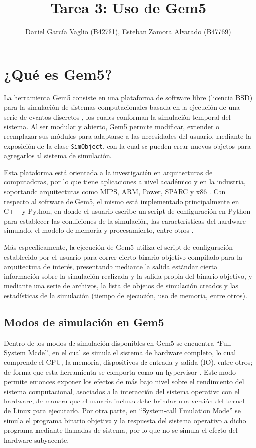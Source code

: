 \documentclass {article}
\begin{document}
\title{Tarea 3: Uso de Gem5}
\author{Daniel García Vaglio (B42781), Esteban Zamora Alvarado (B47769)}

\maketitle

\section{¿Qué es Gem5?}
\cite{opencv} %
La herramienta Gem5 consiste en una plataforma de software libre (licencia BSD) para la simulación
de sistemas computacionales basada en la ejecución de una serie de eventos discretos \cite{***}, los
cuales conforman la simulación temporal del sistema. Al ser modular y abierto, Gem5 permite
modificar, extender o reemplazar sus módulos para adaptarse a las necesidades del usuario, mediante
la exposición de la clase \texttt{SimObject}, con la cual se pueden crear nuevos objetos para
agregarlos al sistema de simulación.

Esta plataforma está orientada a la investigación en arquitecturas de computadoras, por lo que tiene
aplicaciones a nivel académico y en la industria, soportando arquitecturas como MIPS, ARM, Power,
SPARC y x86 \cite{***}. Con respecto al software de Gem5, el mismo está implementado principalmente
en C++ y Python, en donde el usuario escribe un script de configuración en Python para establecer
las condiciones de la simulación, las características del hardware simulado, el modelo de memoria y
procesamiento, entre otros \cite{***}.

Más específicamente, la ejecución de Gem5 utiliza el script de configuración establecido por el
usuario para correr cierto binario objetivo compilado para la arquitectura de interés, presentando
mediante la salida estándar cierta información sobre la simulación realizada y la salida propia del
binario objetivo, y mediante una serie de archivos, la lista de objetos de simulación creados y las
estadísticas de la simulación (tiempo de ejecución, uso de memoria, entre otros).

\subsection{Modos de simulación en Gem5}
Dentro de los modos de simulación disponibles en Gem5 se encuentra ``Full System Mode'', en el cual
se simula el sistema de hardware completo, lo cual comprende el CPU, la memoria, dispositivos de
entrada y salida (IO), entre otros; de forma que esta herramienta se comporta como un hypervisor
\cite{***}. Este modo permite entonces exponer los efectos de más bajo nivel sobre el rendimiento
del sistema computacional, asociados a la interacción del sistema operativo con el hardware, de
manera que el usuario incluso debe brindar una versión del kernel de Linux para ejecutarlo. Por otra
parte, en ``System-call Emulation Mode'' se simula el programa binario objetivo y la respuesta del
sistema operativo a dicho programa mediante llamadas de sistema, por lo que no se simula el efecto
del hardware subyacente.
\end{document}
